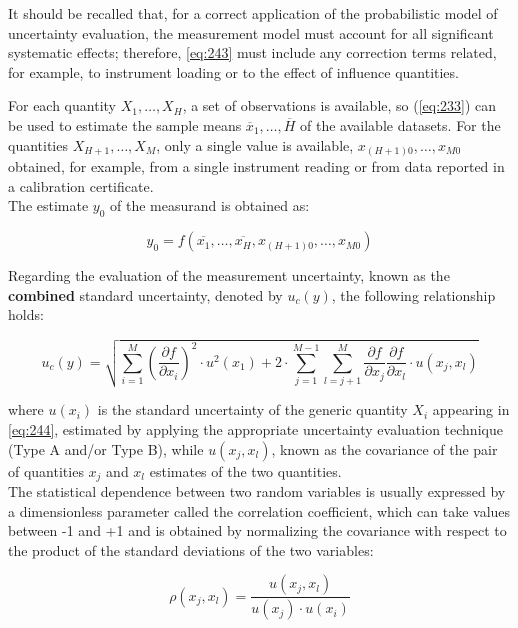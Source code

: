\documentclass[../main.tex]{subfiles}
\begin{document}
It should be recalled that, for a correct application of the probabilistic model of uncertainty evaluation, the measurement model must account for all significant systematic effects; therefore, \autoref{eq:243} must include any correction terms related, for example, to instrument loading or to the effect of influence quantities.

For each quantity $X_1, \dots, X_H$, a set of observations is available, so (\autoref{eq:233}) can be used to estimate the sample means $\overline{x}_1, \dots, \overline{H}$ of the available datasets. For the quantities $X_{H+1}, \dots, X_{M}$, only a single value is available, $x_{(H+1)0}, \dots, x_{M0}$ obtained, for example, from a single instrument reading or from data reported in a calibration certificate.\\

The estimate $y_0$ of the measurand is obtained as:

\begin{equation}
	y_0 = f \left(\overline{x_1}, \dots, \overline{x_H}, x_{(H+1)0}, \dots, x_{M0} \right)
\label{eq:244}	
\end{equation}


Regarding the evaluation of the measurement uncertainty, known as the \textbf{combined} standard uncertainty, denoted by $u_c(y)$, the following relationship holds:

\begin{equation}
	u_c(y) = \sqrt{\sum_{i=1}^M \left( \frac{\partial f}{\partial x_i} \right)^2 \cdot u^2(x_1) + 2 \cdot \sum_{j=1}^{M-1} \sum_{l=j+1}^M \frac{\partial f}{\partial x_j} \frac{\partial f}{\partial x_l} \cdot u(x_j, x_l) }
\label{eq:245}	
\end{equation}

where $u(x_i)$ is the standard uncertainty of the generic quantity $X_i$ appearing in \autoref{eq:244}, estimated by applying the appropriate uncertainty evaluation technique (Type A and/or Type B), while $u(x_j, x_l)$, known as the covariance of the pair of quantities $x_j$ and $x_l$ estimates of the two quantities.\\

The statistical dependence between two random variables is usually expressed by a dimensionless parameter called the correlation coefficient, which can take values between -1 and +1 and is obtained by normalizing the covariance with respect to the product of the standard deviations of the two variables:

\begin{equation}
	\rho(x_j, x_l) = \frac{u(x_j, x_l)}{u(x_j) \cdot u(x_i)}
\end{equation}
\end{document}
